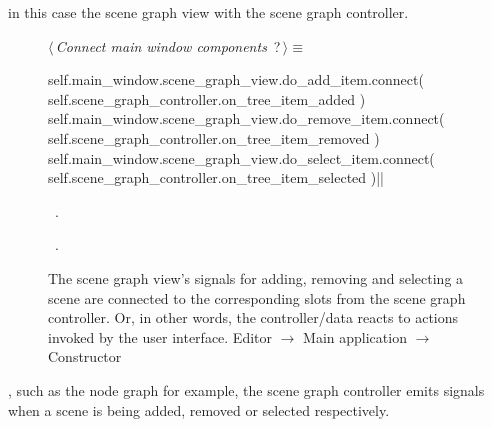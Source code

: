 \documentclass[%
    a4paper,    %
    justified,  %
    nobib,      %
    openany     %
]{tufte-book}
\begin{document}
 in
this case the scene graph view with the scene graph controller.

\begin{figure}
\begin{flushleft} \small
\begin{minipage}{\linewidth}\label{scrap53}\raggedright\small
{} $\langle\,${\itshape Connect main window components}\nobreak\ {\footnotesize {?}}$\,\rangle\equiv$
\vspace{-1ex}
\begin{pythoncode}
self.main_window.scene_graph_view.do_add_item.connect(
    self.scene_graph_controller.on_tree_item_added
)
self.main_window.scene_graph_view.do_remove_item.connect(
    self.scene_graph_controller.on_tree_item_removed
)
self.main_window.scene_graph_view.do_select_item.connect(
    self.scene_graph_controller.on_tree_item_selected
)|\NWsep|
\end{pythoncode}
\vspace{1.5ex}
\footnotesize
\begin{list}{}{\setlength{\itemsep}{-\parsep}\setlength{\itemindent}{-\leftmargin}}
\item \NWtxtMacroDefBy\ .
\item \NWtxtMacroRefIn\ .

\item{}
\end{list}
\end{minipage}\vspace{4ex}
\end{flushleft}
\caption{The scene graph view's signals for adding, removing and selecting a
  scene are connected to the corresponding slots from the scene graph
  controller. Or, in other words, the controller/data reacts to actions invoked
  by the user interface.
  \newline{}\newline{}Editor $\rightarrow$ Main application
  $\rightarrow$ Constructor}
\label{editor:lst:main-application:constructor:connect-scene-graph-view}
\end{figure}

, such as the node
graph for example, the scene graph controller emits signals when a scene is
being added, removed or selected respectively.
\end{document}
